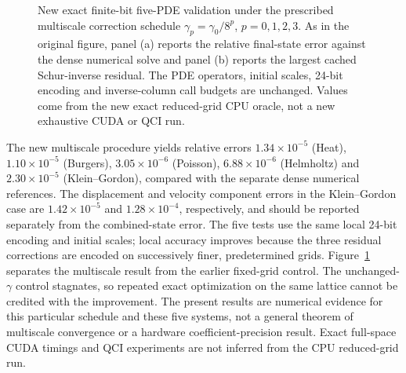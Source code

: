 \begin{figure}[t]
\centering
{}
\caption{New exact finite-bit five-PDE validation under the prescribed
multiscale correction schedule $\gamma_p=\gamma_0/8^p$, $p=0,1,2,3$.
As in the original figure, panel (a) reports the relative final-state error
against the dense numerical solve and panel (b) reports the largest cached
Schur-inverse residual. The PDE operators, initial scales, 24-bit encoding
and inverse-column call budgets are unchanged. Values come from the
new exact reduced-grid CPU oracle, not a new exhaustive CUDA or QCI run.}
\label{fig:fixed_validation}
\end{figure}

The new multiscale procedure yields relative errors
$1.34\times10^{-5}$ (Heat), $1.10\times10^{-5}$ (Burgers),
$3.05\times10^{-6}$ (Poisson), $6.88\times10^{-6}$ (Helmholtz) and
$2.30\times10^{-5}$ (Klein--Gordon), compared with the separate dense
numerical references. The displacement and velocity component errors in
the Klein--Gordon case are $1.42\times10^{-5}$ and $1.28\times10^{-4}$,
respectively, and should be reported separately from the combined-state
error. The five tests use the same local 24-bit encoding and initial scales;
local accuracy improves because the three residual corrections are encoded
on successively finer, predetermined grids. Figure~\ref{fig:fixed_validation}
separates the multiscale result from the earlier fixed-grid control. The unchanged-$\gamma$ control stagnates, so repeated exact optimization
on the same lattice cannot be credited with the improvement. The present
results are numerical evidence for this particular schedule and these
five systems, not a general theorem of multiscale convergence or a
hardware coefficient-precision result. Exact full-space CUDA timings and
QCI experiments are not inferred from the CPU reduced-grid run.


